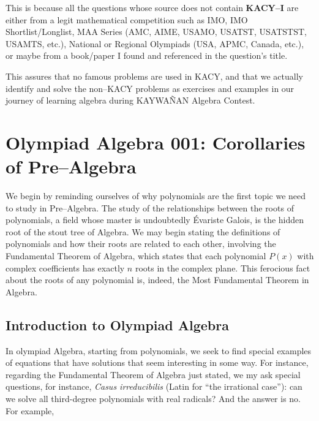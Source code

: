 \documentclass[12pt,a4paper]{memoir}
\theoremstyle{definition}
\begin{document}
This is because all the questions whose source does not contain \textbf{KACY--I} are either from a legit mathematical competition such as IMO, IMO Shortlist/Longlist, MAA Series (AMC, AIME, USAMO, USATST, USATSTST, USAMTS, etc.), National or Regional Olympiads (USA, APMC, Canada, etc.), or maybe from a book/paper I found and referenced in the question's title. 

\vspace{0.5em}

This assures that no famous problems are used in KACY, and that we actually identify and solve the non--KACY problems as exercises and examples in our journey of learning algebra during KAYWAÑAN Algebra Contest.

\newpage
\section{Olympiad Algebra 001: Corollaries of Pre--Algebra}
We begin by reminding ourselves of why polynomials are the first topic we need to study in Pre--Algebra. The study of the relationships between the roots of polynomials, a field whose master is undoubtedly Évariste Galois, is the hidden root of the stout tree of Algebra. We may begin stating the definitions of polynomials and how their roots are related to each other, involving the Fundamental Theorem of Algebra, which states that each polynomial $P(x)$ with complex coefficients has exactly $n$ roots in the complex plane. This ferocious fact about the roots of any polynomial is, indeed, the Most Fundamental Theorem in Algebra. 

\subsection{Introduction to Olympiad Algebra}


	In olympiad Algebra, starting from polynomials, we seek to find special examples of equations that have solutions that seem interesting in some way. For instance, regarding the Fundamental Theorem of Algebra just stated, we my ask special questions, for instance, \textit{Casus irreducibilis} (Latin for ``the irrational case''): can we solve all third-degree polynomials with real radicals? And the answer is no. For example,
	
\end{document}

